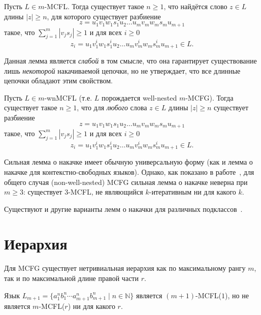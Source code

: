 \begin{theorem}
    \label{thm:pumping_mcfg}
    Пусть $L \in m$-MCFL. Тогда существует такое $n \ge 1$, что найдётся слово $z \in L$ длины $|z| \ge n$, для которого существует разбиение
    \[
    z = u_1 v_1 w_1 s_1 u_2 \ldots u_m v_m w_m s_m u_{m+1}
    \]
    такое, что $\sum_{j=1}^m |v_j s_j| \ge 1$ и для всех $i \ge 0$
    \[
    z_i = u_1 v_1^i w_1 s_1^i u_2 \ldots u_m v_m^i w_m s_m^i u_{m+1} \in L.
    \]
\end{theorem}

Данная лемма является \emph{слабой} в том смысле, что она гарантирует существование лишь \emph{некоторой} накачиваемой цепочки, но не утверждает, что все длинные цепочки обладают этим свойством.

\begin{theorem}
    \label{thm:pumping_wnmcfg}
    Пусть $L \in m$-wnMCFL (т.е. $L$ порождается well-nested $m$-MCFG). Тогда существует такое $n \ge 1$, что для \emph{любого} слова $z \in L$ длины $|z| \ge n$ существует разбиение
    \[
    z = u_1 v_1 w_1 s_1 u_2 \ldots u_m v_m w_m s_m u_{m+1}
    \]
    такое, что $\sum_{j=1}^m |v_j s_j| \ge 1$ и для всех $i \ge 0$
    \[
    z_i = u_1 v_1^i w_1 s_1^i u_2 \ldots u_m v_m^i w_m s_m^i u_{m+1} \in L.
    \]
\end{theorem}

Сильная лемма о накачке имеет обычную универсальную форму (как и лемма о накачке для контекстно-свободных языков).
Однако, как показано в работе~, для общего случая (non-well-nested) MCFG сильная лемма о накачке неверна при $m \ge 3$: существует $3$-MCFL, не являющийся $k$-итеративным ни для какого $k$.

Существуют и другие варианты лемм о накачки для различных подклассов~\sidecite{!!!}.

\section{Иерархия}

Для MCFG существует нетривиальная иерархия как по максимальному рангу $m$, так и по максимальной длине правой части $r$.

\begin{theorem}
    \label{thm:hierarchy_m}
    Язык $L_{m+1} = \{a_1^n b_1^n \cdots a_{m+1}^n b_{m+1}^n \mid n \in \mathbb{N}\}$ является $(m+1)$-MCFL($1$), но не является $m$-MCFL($r$) ни для какого $r$.
\end{theorem}

